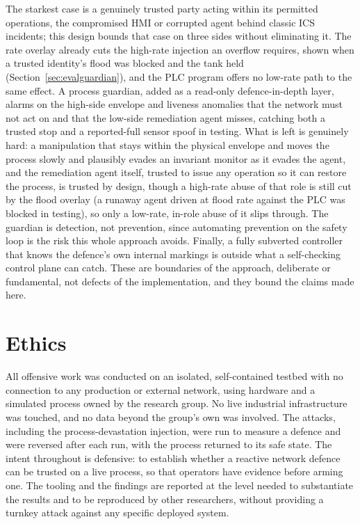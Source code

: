 The starkest case is a genuinely trusted party acting within its permitted operations, the compromised HMI or corrupted agent behind classic ICS incidents; this design bounds that case on three sides without eliminating it. The rate overlay already cuts the high-rate injection an overflow requires, shown when a trusted identity's flood was blocked and the tank held (Section~\ref{sec:evalguardian}), and the PLC program offers no low-rate path to the same effect. A process guardian, added as a read-only defence-in-depth layer, alarms on the high-side envelope and liveness anomalies that the network must not act on and that the low-side remediation agent misses, catching both a trusted stop and a reported-full sensor spoof in testing. What is left is genuinely hard: a manipulation that stays within the physical envelope and moves the process slowly and plausibly evades an invariant monitor as it evades the agent, and the remediation agent itself, trusted to issue any operation so it can restore the process, is trusted by design, though a high-rate abuse of that role is still cut by the flood overlay (a runaway agent driven at flood rate against the PLC was blocked in testing), so only a low-rate, in-role abuse of it slips through. The guardian is detection, not prevention, since automating prevention on the safety loop is the risk this whole approach avoids. Finally, a fully subverted controller that knows the defence's own internal markings is outside what a self-checking control plane can catch. These are boundaries of the approach, deliberate or fundamental, not defects of the implementation, and they bound the claims made here.

\section{Ethics}
\label{sec:ethics}

All offensive work was conducted on an isolated, self-contained testbed with no connection to any production or external network, using hardware and a simulated process owned by the research group. No live industrial infrastructure was touched, and no data beyond the group's own was involved. The attacks, including the process-devastation injection, were run to measure a defence and were reversed after each run, with the process returned to its safe state. The intent throughout is defensive: to establish whether a reactive network defence can be trusted on a live process, so that operators have evidence before arming one. The tooling and the findings are reported at the level needed to substantiate the results and to be reproduced by other researchers, without providing a turnkey attack against any specific deployed system.
